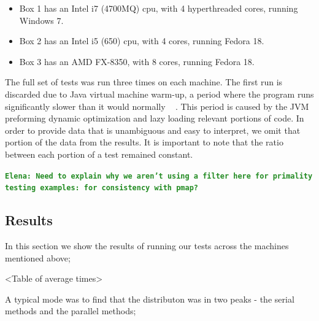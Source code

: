 \documentclass[12pt]{article}
\newcommand{\comment}[1]{{\bf \tt  {#1}}}
\newcommand{\emcomment}[1]{\textcolor{ForestGreen}{\comment{Elena: {#1}}}}
\begin{document}
\begin{itemize}
 \item 
 Box 1 has an Intel i7 (4700MQ) cpu, with 4 hyperthreaded cores, running Windows 7.
 \item
 Box 2 has an Intel i5 (650) cpu, with 4 cores, running Fedora 18.
 \item
 Box 3 has an AMD FX-8350, with 8 cores, running Fedora 18. 
 \end{itemize}
  
The full set of tests was run three times on each machine. The first run is discarded due to Java virtual machine warm-up, a period where the program runs significantly slower than it would normally ~\cite{Blackburn:2008} . This period is caused by the JVM preforming dynamic optimization and lazy loading relevant portions of code. In order to provide data that is unambiguous and easy to interpret, we omit that portion of the data from the results. It is important to note that the ratio between each portion of a test remained constant.

\emcomment{Need to explain why we aren't using a filter here for primality testing examples: for consistency with pmap?}

\subsection{Results}\label{sec:results}
In this section we show the results of running our tests across the machines mentioned above;

<Table of average times>
 
A typical mode was to find that the distributon was in two peaks - the serial methods and the parallel methods; 
\end{document}
